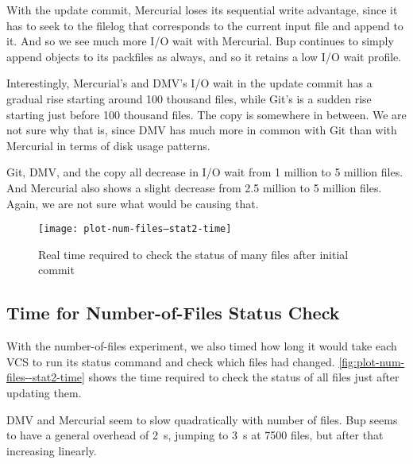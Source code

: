 With the update commit, Mercurial loses its sequential write advantage, since it
has to seek to the \gls{filelog} that corresponds to the current input file and
append to it. And so we see much more I/O wait with Mercurial. Bup continues to
simply append objects to its \glspl{packfile} as always, and so it retains a low
I/O wait profile.

Interestingly, Mercurial's and \gls{DMV}'s I/O wait in the update commit has a
gradual rise starting around 100 thousand files, while Git's is a sudden rise
starting just before 100 thousand files. The copy is somewhere in between. We
are not sure why that is, since \gls{DMV} has much more in common with Git than
with Mercurial in terms of disk usage patterns.

Git, \gls{DMV}, and the copy all decrease in I/O wait from \num{1} million to
\num{5} million files. And Mercurial also shows a slight decrease from \num{2.5}
million to \num{5} million files. Again, we are not sure what would be causing
that.

%


\begin{figure}[p]
    \begin{leftfullpage}
        \caption{Real time required to check the status of many files after
        initial commit}
        \label{fig:plot-num-files--stat2-time}
        \centering

        \explainlogsubfig

        \texttt{[image: plot-num-files--stat2-time]}
    \end{leftfullpage}
\end{figure}

\cleardoublepage

\subsection{Time for Number-of-Files Status Check}

With the number-of-files experiment, we also timed how long it would take each
\gls{VCS} to run its status command and check which files had changed.
\autoref{fig:plot-num-files--stat2-time} shows the time required to check the
status of all files just after updating them.

\gls{DMV} and Mercurial seem to slow quadratically with number of files. Bup
seems to have a general overhead of \SI{2}{\second}, jumping to \SI{3}{\second}
at \num{7500} files, but after that increasing linearly.


